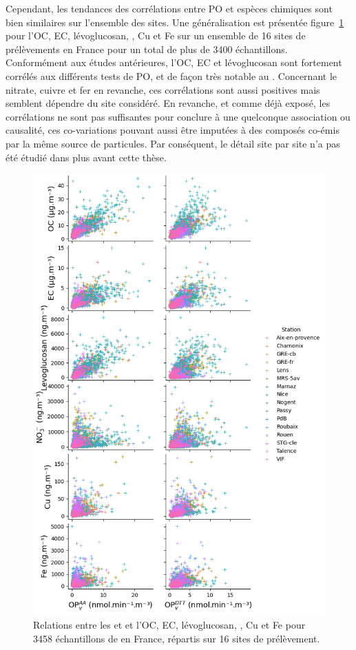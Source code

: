 Cependant, les tendances des corrélations entre PO et espèces chimiques sont bien
similaires sur l'ensemble des sites. Une généralisation est présentée
figure~\ref{fig:pairplotOPs} pour l'OC, EC, lévoglucosan, \NOt, Cu et Fe sur un ensemble
de 16 sites de prélèvements en France pour un total de plus de 3400 échantillons.
Conformément aux études antérieures, l'OC, EC et lévoglucosan sont fortement corrélés
aux différents tests de PO, et de façon très notable au \POAAv. Concernant le nitrate,
cuivre et fer en revanche, ces corrélations sont aussi positives mais semblent dépendre du
site considéré.
En revanche, et comme déjà exposé, les corrélations ne sont pas suffisantes pour conclure
à une quelconque association ou causalité, ces co-variations pouvant aussi être imputées à
des composés co-émis par la même source de particules. 
Par conséquent, le détail site par site n'a pas été étudié dans plus avant cette thèse.

\begin{figure}[ht]
    \centering
    \includegraphics[width=0.7\linewidth]{figures/chapter04/pairplot_OPs.png}
    \caption{Relations entre les \POAAv{} et \PODTTv{} et l'OC, EC, lévoglucosan, \NOt, Cu et Fe pour
    3458 échantillons de \PMdix{} en France, répartis sur 16 sites de prélèvement.}%
    \label{fig:pairplotOPs}
\end{figure}

